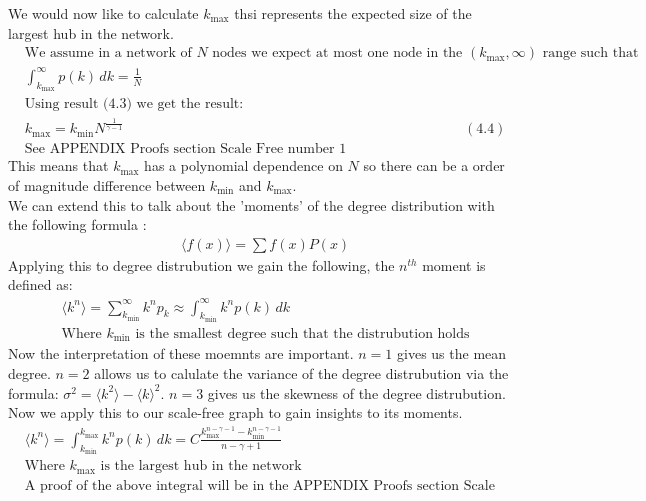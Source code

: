 \documentclass{article}
\begin{document}
        We would now like to calculate $k_{\text{max}}$ thsi represents the expected size of the largest hub in the network.
        \begin{align*}
            &\text{We assume in a network of $N$ nodes we expect at most one node in the $(k_{\text{max}},\infty)$ range such that}\\
            &\int_{k_{\text{max}}}^{\infty}p(k) \,dk = \frac{1}{N}\\
            &\text{Using result (4.3) we get the result:}\\
            &k_{\text{max}} = k_{\text{min}}N^{\frac{1}{\gamma -1}} &(4.4)\\
            &\text{See APPENDIX Proofs section Scale Free number 1 }
        \end{align*}
        This means that $k_{\text{max}}$ has a polynomial dependence on $N$ so there can be a order of magnitude difference between $k_{\text{min}}$ and $k_{\text{max}}$.\\
        We can extend this to talk about the 'moments' of the degree distribution with the following formula \parencite{papoulis2002probability}:\\
        \begin{align*}
            &\langle f(x) \rangle = \sum f(x)P(x)
        \end{align*}
        Applying this to degree distrubution we gain the following, the $n^{th}$ moment is defined as:\\
        \begin{align*}
            &\langle k^n \rangle = \sum_{k_{\text{min}}}^{\infty}k^{n}p_{k} \approx \int_{k_{\text{min}}}^{\infty} k^{n}p(k)  \,dk \\
            &\text{Where $k_{\text{min}}$ is the smallest degree such that the distrubution holds}
        \end{align*}
        Now the interpretation of these moemnts are important. $n=1$ gives us the mean degree. $n=2$ allows us to calulate the variance of the degree distrubution via the formula: $\sigma^2 = \langle k^2 \rangle - \langle k\rangle ^2$. $n=3$ gives us the skewness of the degree distrubution.
        Now we apply this to our scale-free graph to gain insights to its moments.
        \begin{align*}
            &\langle k^n \rangle = \int_{k_{\text{min}}}^{k_{\text{max}}}k^{n}p(k) \,dk = C\frac{k^{n-\gamma -1}_{\text{max}}-k^{n-\gamma -1}_{\text{min}}}{n-\gamma +1}\\
            &\text{Where $k_{\text{max}}$ is the largest hub in the network }\\
            &\text{A proof of the above integral will be in the APPENDIX Proofs section Scale Free number 2}
        \end{align*}
\end{document}
